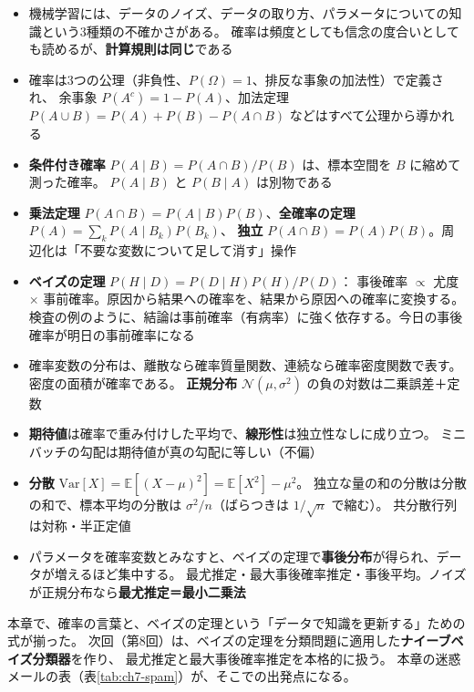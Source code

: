 \begin{itemize}
  \item 機械学習には、データのノイズ、データの取り方、パラメータについての知識という3種類の不確かさがある。
    確率は頻度としても信念の度合いとしても読めるが、\textbf{計算規則は同じ}である
  \item 確率は3つの公理（非負性、$P(\Omega) = 1$、排反な事象の加法性）で定義され、
    余事象 $P(A^c) = 1 - P(A)$、加法定理 $P(A \cup B) = P(A) + P(B) - P(A \cap B)$ などはすべて公理から導かれる
  \item \textbf{条件付き確率} $P(A \mid B) = P(A \cap B)/P(B)$ は、標本空間を $B$ に縮めて測った確率。
    $P(A \mid B)$ と $P(B \mid A)$ は別物である
  \item \textbf{乗法定理} $P(A \cap B) = P(A \mid B)P(B)$、\textbf{全確率の定理} $P(A) = \sum_k P(A \mid B_k)P(B_k)$、
    \textbf{独立} $P(A \cap B) = P(A)P(B)$。周辺化は「不要な変数について足して消す」操作
  \item \textbf{ベイズの定理} $P(H \mid D) = P(D \mid H)P(H)/P(D)$：
    事後確率 $\propto$ 尤度 $\times$ 事前確率。原因から結果への確率を、結果から原因への確率に変換する。
    検査の例のように、結論は事前確率（有病率）に強く依存する。今日の事後確率が明日の事前確率になる
  \item 確率変数の分布は、離散なら確率質量関数、連続なら確率密度関数で表す。密度の面積が確率である。
    \textbf{正規分布} $\mathcal{N}(\mu, \sigma^2)$ の負の対数は二乗誤差＋定数
  \item \textbf{期待値}は確率で重み付けした平均で、\textbf{線形性}は独立性なしに成り立つ。
    ミニバッチの勾配は期待値が真の勾配に等しい（不偏）
  \item \textbf{分散} $\mathrm{Var}[X] = \mathbb{E}[(X - \mu)^2] = \mathbb{E}[X^2] - \mu^2$。
    独立な量の和の分散は分散の和で、標本平均の分散は $\sigma^2/n$（ばらつきは $1/\sqrt{n}$ で縮む）。
    共分散行列は対称・半正定値
  \item パラメータを確率変数とみなすと、ベイズの定理で\textbf{事後分布}が得られ、データが増えるほど集中する。
    最尤推定・最大事後確率推定・事後平均。ノイズが正規分布なら\textbf{最尤推定＝最小二乗法}
\end{itemize}

本章で、確率の言葉と、ベイズの定理という「データで知識を更新する」ための式が揃った。
次回（第8回）は、ベイズの定理を分類問題に適用した\textbf{ナイーブベイズ分類器}を作り、
最尤推定と最大事後確率推定を本格的に扱う。
本章の迷惑メールの表（表\ref{tab:ch7-spam}）が、そこでの出発点になる。


